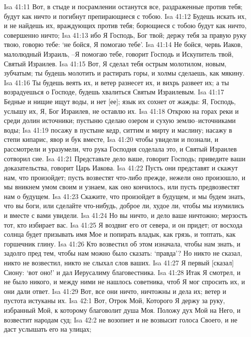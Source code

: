 Isa 41:11  Вот, в стыде и посрамлении останутся все, раздраженные против тебя; будут как ничто и погибнут препирающиеся с тобою.
Isa 41:12  Будешь искать их, и не найдешь их, враждующих против тебя; борющиеся с тобою будут как ничто, совершенно ничто;
Isa 41:13  ибо Я Господь, Бог твой; держу тебя за правую руку твою, говорю тебе: `не бойся, Я помогаю тебе'.
Isa 41:14  Не бойся, червь Иаков, малолюдный Израиль, --Я помогаю тебе, говорит Господь и Искупитель твой, Святый Израилев.
Isa 41:15  Вот, Я сделал тебя острым молотилом, новым, зубчатым; ты будешь молотить и растирать горы, и холмы сделаешь, как мякину.
Isa 41:16  Ты будешь веять их, и ветер разнесет их, и вихрь развеет их; а ты возрадуешься о Господе, будешь хвалиться Святым Израилевым.
Isa 41:17  Бедные и нищие ищут воды, и нет [ее]; язык их сохнет от жажды: Я, Господь, услышу их, Я, Бог Израилев, не оставлю их.
Isa 41:18  Открою на горах реки и среди долин источники; пустыню сделаю озером и сухую землю--источниками воды;
Isa 41:19  посажу в пустыне кедр, ситтим и мирту и маслину; насажу в степи кипарис, явор и бук вместе,
Isa 41:20  чтобы увидели и познали, и рассмотрели и уразумели, что рука Господня соделала это, и Святый Израилев сотворил сие.
Isa 41:21  Представьте дело ваше, говорит Господь; приведите ваши доказательства, говорит Царь Иакова.
Isa 41:22  Пусть они представят и скажут нам, что произойдет; пусть возвестят что-либо прежде, нежели оно произошло, и мы вникнем умом своим и узнаем, как оно кончилось, или пусть предвозвестят нам о будущем.
Isa 41:23  Скажите, что произойдет в будущем, и мы будем знать, что вы боги, или сделайте что-нибудь, доброе ли, худое ли, чтобы мы изумились и вместе с вами увидели.
Isa 41:24  Но вы ничто, и дело ваше ничтожно; мерзость тот, кто избирает вас.
Isa 41:25  Я воздвиг его от севера, и он придет; от восхода солнца будет призывать имя Мое и попирать владык, как грязь, и топтать, как горшечник глину.
Isa 41:26  Кто возвестил об этом изначала, чтобы нам знать, и задолго пред тем, чтобы нам можно было сказать: `правда'? Но никто не сказал, никто не возвестил, никто не слыхал слов ваших.
Isa 41:27  Я первый [сказал] Сиону: `вот оно!' и дал Иерусалиму благовестника.
Isa 41:28  Итак Я смотрел, и не было никого, и между ними не нашлось советника, чтоб Я мог спросить их, и они дали ответ.
Isa 41:29  Вот, все они ничто, ничтожны и дела их; ветер и пустота истуканы их.
Isa 42:1  Вот, Отрок Мой, Которого Я держу за руку, избранный Мой, к которому благоволит душа Моя. Положу дух Мой на Него, и возвестит народам суд;
Isa 42:2  не возопиет и не возвысит голоса Своего, и не даст услышать его на улицах;
